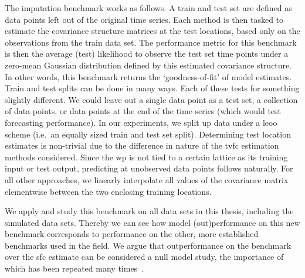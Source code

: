 The imputation benchmark works as follows.
A train and test set are defined as data points left out of the original time series.
%
Each method is then tasked to estimate the covariance structure matrices at the test locations, based only on the observations from the train data set.
The performance metric for this benchmark is then the average (test) likelihood to observe the test set time points under a zero-mean Gaussian distribution defined by this estimated covariance structure.
In other words, this benchmark returns the `goodness-of-fit' of model estimates.
%
Train and test splits can be done in many ways.
Each of these tests for something slightly different.
We could leave out a single data point as a test set, a collection of data points, or data points at the end of the time series (which would test forecasting performance).
%
In our experiments, we split up data under a \gls{leoo} scheme (i.e.~an equally sized train and test set split).
%
Determining test location estimates is non-trivial due to the difference in nature of the \gls{tvfc} estimation methods considered.
Since the \gls{wp} is not tied to a certain lattice as its training input or test output, predicting at unobserved data points follows naturally.
For all other approaches, we linearly interpolate all values of the covariance matrix elementwise between the two enclosing training locations.

We apply and study this benchmark on all data sets in this thesis, including the simulated data sets.
Thereby we can see how model (out)performance on this new benchmark corresponds to performance on the other, more established benchmarks used in the field.
%
We argue that outperformance on the benchmark over the \gls{sfc} estimate can be considered a null model study, the importance of which has been repeated many times~\parencite[see e.g.][]{Miller2018, Liegeois2021, Novelli2022}.
